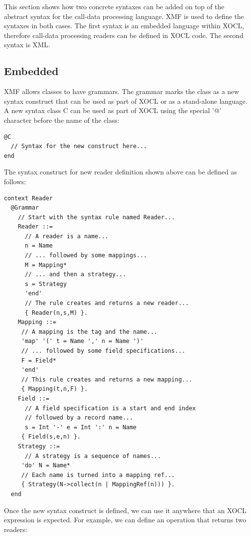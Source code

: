 This section shows how two concrete syntaxes can be added on top 
of the abstract syntax for the call-data processing language. XMF 
is used to define the syntaxes in both cases. The first syntax is 
an embedded language within XOCL, therefore call-data processing 
readers can be defined in XOCL code. The second syntax is XML.

\subsection{Embedded}

XMF allows classes to have grammars. The grammar marks the class as 
a new syntax construct that can be used as part of XOCL or as a stand-alone 
language. A new syntax class C can be used as part of XOCL using the 
special '@' character before the name of the class:
\begin{lstlisting}
@C
  // Syntax for the new construct here...
end
\end{lstlisting}
The syntax construct for new reader definition shown above can be 
defined as follows:
\begin{lstlisting}
context Reader
  @Grammar
    // Start with the syntax rule named Reader...
    Reader ::= 
      // A reader is a name...
      n = Name 
      // ... followed by some mappings...
      M = Mapping* 
      // ... and then a strategy...
      s = Strategy 
      'end' 
      // The rule creates and returns a new reader...
      { Reader(n,s,M) }.
    Mapping ::= 
     // A mapping is the tag and the name...
     'map' '(' t = Name ',' n = Name ')' 
     // ... followed by some field specifications...
     F = Field* 
     'end' 
     // This rule creates and returns a new mapping...
     { Mapping(t,n,F) }.
    Field ::= 
      // A field specification is a start and end index
      // followed by a record name...
      s = Int '-' e = Int ':' n = Name 
     { Field(s,e,n) }.
    Strategy ::= 
      // A strategy is a sequence of names...
     'do' N = Name* 
     // Each name is turned into a mapping ref...
     { Strategy(N->collect(n | MappingRef(n))) }.
  end
\end{lstlisting}
Once the new syntax construct is defined, we can use it anywhere 
that an XOCL expression is expected. For example, we can define 
an operation that returns two readers:

